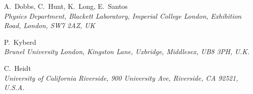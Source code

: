 \clearpage
\thispagestyle{plain}
\setlength\parindent{0em}%
  A.~Dobbs, C.~Hunt, K.~Long, E.~Santos
  \\{\it
    Physics Department, Blackett Laboratory, Imperial College London,
    Exhibition Road, London, SW7 2AZ, UK
  }
  \par \filbreak
  P.~Kyberd
  \\{\it
    Brunel University London, Kingston Lane, Uxbridge,
    Middlesex, UB8 3PH, U.K.
  } \\ 
  \par \filbreak
  C.~Heidt
  \\{\it
    University of California Riverside,
    900 University Ave, Riverside, CA 92521, U.S.A.
  } \\ 
  \par \filbreak
